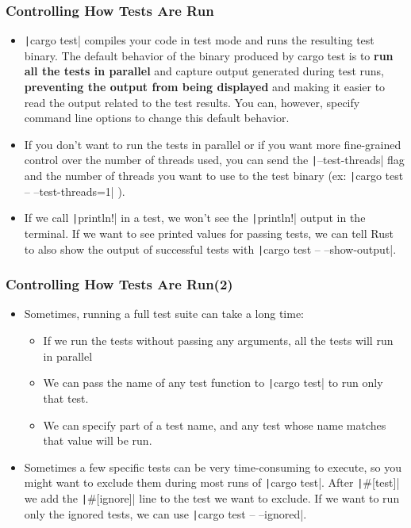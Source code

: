 \documentclass{beamer}
\begin{document}
\begin{frame}[fragile]
	\frametitle{Controlling How Tests Are Run}
	\begin{itemize}
		\item \texttt|cargo test| compiles your code in test mode and runs the resulting test binary. The default behavior of the binary produced by cargo test is to \textbf{run all the tests in parallel} and capture output generated during test runs,\textbf{ preventing the output from being displayed} and making it easier to read the output related to the test results. You can, however, specify command line options to change this default behavior.
		\item If you don’t want to run the tests in parallel or if you want more fine-grained control over the number of threads used, you can send the \texttt|--test-threads|  flag and the number of threads you want to use to the test binary (ex: \texttt|cargo test -- --test-threads=1| ).
		\item If we call \texttt|println!|  in a test, we won’t see the \texttt|println!| output in the terminal. If we want to see printed values for passing tests, we can tell Rust to also show the output of successful tests with \texttt|cargo test -- --show-output|.
	\end{itemize}
\end{frame}

\begin{frame}[fragile]
	\frametitle{Controlling How Tests Are Run(2)}
	\begin{itemize}
		\item Sometimes, running a full test suite can take a long time:
		\begin{itemize}
			\item If we run the tests without passing any arguments, all the tests will run in parallel
			\item 	We can pass the name of any test function to  \texttt|cargo test| to run only that test.
			\item 	We can specify part of a test name, and any test whose name matches that value will be run.
		\end{itemize}
	\item Sometimes a few specific tests can be very time-consuming to execute, so you might want to exclude them during most runs of \texttt|cargo test|. After  \texttt|#[test]| we add the  \texttt|#[ignore]| line to the test we want to exclude.   If we want to run only the ignored tests, we can use  \texttt|cargo test -- --ignored|.
	\inputminted[fontsize=\scriptsize]{rust}{./code/test8.rs}
	\end{itemize}
\end{frame}
\end{document}

